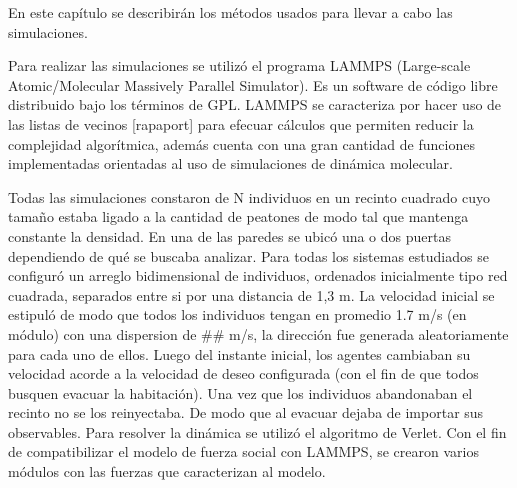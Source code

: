 
\noindent En este capítulo se describirán los métodos usados para llevar a cabo las simulaciones. 

\noindent Para realizar las simulaciones se utilizó el programa LAMMPS (Large-scale Atomic/Molecular Massively Parallel Simulator).
Es un software de código libre distribuido bajo los términos de GPL.
LAMMPS se caracteriza por hacer uso de las listas de vecinos [rapaport] para efecuar cálculos que permiten reducir la
complejidad algorítmica, además cuenta con una gran cantidad de funciones implementadas orientadas al uso de simulaciones
de dinámica molecular. 

\noindent Todas las simulaciones constaron de N individuos en un recinto cuadrado cuyo tamaño estaba ligado a la cantidad de
peatones de modo tal que mantenga constante la densidad. En una de las paredes se ubicó una o dos puertas dependiendo de qué 
se buscaba analizar.
Para todas los sistemas estudiados se configuró un arreglo bidimensional de individuos, ordenados inicialmente tipo
red cuadrada, separados entre si por una distancia de 1,3 m. La velocidad inicial se estipuló de modo que todos los individuos
tengan en promedio 1.7 m/s (en módulo) con una dispersion de ## m/s, la dirección fue generada aleatoriamente para
cada uno de ellos. Luego del instante inicial, los agentes cambiaban su velocidad acorde a la velocidad de deseo configurada 
(con el fin de que todos busquen evacuar la habitación). Una vez que los individuos abandonaban el recinto no se los reinyectaba.
De modo que al evacuar dejaba de importar sus observables. 
Para resolver la dinámica se utilizó el algoritmo de Verlet. 
\noindent Con el fin de compatibilizar el modelo de fuerza social con LAMMPS, se crearon varios módulos con las fuerzas que
caracterizan al modelo.   







